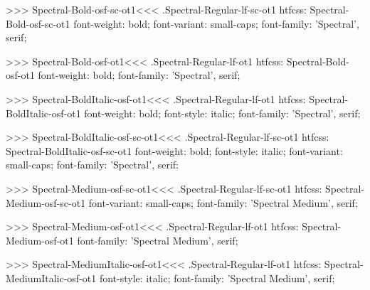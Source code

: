 >>>
\<Spectral-Bold-osf-sc-ot1\><<<
.Spectral-Regular-lf-sc-ot1
htfcss:  Spectral-Bold-osf-sc-ot1  font-weight: bold; font-variant: small-caps; font-family: 'Spectral', serif;

>>>
\<Spectral-Bold-osf-ot1\><<<
.Spectral-Regular-lf-ot1
htfcss:  Spectral-Bold-osf-ot1  font-weight: bold; font-family: 'Spectral', serif;

>>>
\<Spectral-BoldItalic-osf-ot1\><<<
.Spectral-Regular-lf-ot1
htfcss:  Spectral-BoldItalic-osf-ot1  font-weight: bold; font-style: italic; font-family: 'Spectral', serif;

>>>
\<Spectral-BoldItalic-osf-sc-ot1\><<<
.Spectral-Regular-lf-sc-ot1
htfcss:  Spectral-BoldItalic-osf-sc-ot1  font-weight: bold; font-style: italic; font-variant: small-caps; font-family: 'Spectral', serif;

>>>
\<Spectral-Medium-osf-sc-ot1\><<<
.Spectral-Regular-lf-sc-ot1
htfcss:  Spectral-Medium-osf-sc-ot1  font-variant: small-caps; font-family: 'Spectral Medium', serif;

>>>
\<Spectral-Medium-osf-ot1\><<<
.Spectral-Regular-lf-ot1
htfcss:  Spectral-Medium-osf-ot1  font-family: 'Spectral Medium', serif;

>>>
\<Spectral-MediumItalic-osf-ot1\><<<
.Spectral-Regular-lf-ot1
htfcss:  Spectral-MediumItalic-osf-ot1  font-style: italic; font-family: 'Spectral Medium', serif;

